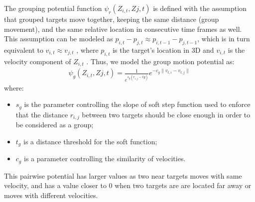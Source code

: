 The  grouping potential function $\psi_r(Z_{i,t} , Z{j,t})$  is defined with the assumption that grouped targets move together, keeping the same distance (group movement), and the same relative location in consecutive time frames as well. This assumption can be
modeled as $p_{i,t} − p_{j,t} \approx p_{i,t-1} - p_{j,t-1}$, which is in turn equivalent to $v_{i,t} \approx v_{j,t}$ , where $p_{i,t}$ is the target’s location in 3D and $v_{i,t}$ is the velocity component of $Z_{i,t}$ .
Thus, we model the group motion potential as:
\begin{eqnarray} \label{eqn: group motion potential}
\psi_g(Z_{i,t} , Z{j,t}) = \frac{1}{e^{s_g(r_{i,j}-tg)} } e^{-c_g \| v_{t,i}-v_{t,j} \|} 
\end{eqnarray}
where:
\begin{itemize}
\item $s_g$ is the parameter controlling the slope of soft step function
used to enforce that the distance $r_{i,j}$ between two targets should be close enough in order to be considered as a group;
\item $t_g$ is a distance threshold for the soft function;
\item $c_g$ is a parameter controlling the similarity of velocities.
\end{itemize}
This pairwise potential has larger values as two near targets moves with same velocity, and has a value closer to $0$ when two targets are are located far away or moves with different velocities.


